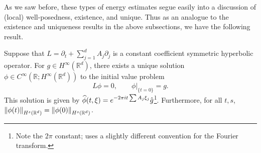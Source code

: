 \documentclass{article}
\begin{document}
As we saw before, these types of energy estimates segue easily into a discussion of (local) well-posedness, existence, and unique. Thus as an analogue to the existence and uniqueness results in the above subsections, we have the following result. 

\begin{prop}
Suppose that $L = \partial_{t} + \sum_{j= 1}^{d}A_{j}\partial_{j}$ is a constant coefficient symmetric hyperbolic operator. For $g \in H^{\infty}(\mathbb{R}^{d})$, there exists a unique solution $\phi \in C^{\infty}(\mathbb{R}; H^{\infty}(\mathbb{R}^{d}))$ to the initial value problem 
\begin{equation}
	L\phi = 0, \qquad \phi|_{\{t = 0\}} = g. 
\end{equation}
This solution is given by $\widehat{\phi}(t, \xi) = e^{-2\pi it\sum A_{j}\xi_{j}}\hat{g}$\footnote{Note the $2\pi$ constant; \cite{Rauch2012} uses a slightly different convention for the Fourier transform.}. Furthermore, for all $t, s$, $\left\Vert \phi(t) \right\Vert_{H^{s}(\mathbb{R}^{d})} = \left\Vert \phi(0) \right\Vert_{H^{s}(\mathbb{R}^{d})}$. 
\end{prop} 
\end{document}
